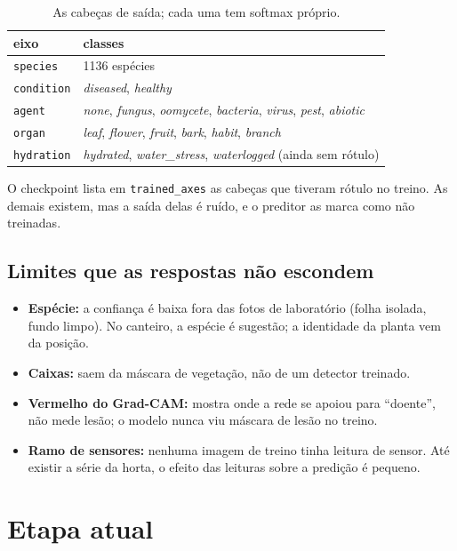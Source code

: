 \documentclass[11pt,a4paper]{article}
\newcommand{\cod}[1]{\texttt{#1}}
\begin{document}
\begin{table}[h]
\centering\small
\begin{tabularx}{0.92\linewidth}{@{}lX@{}}
\toprule
eixo & classes \\
\midrule
\cod{species}   & 1136 espécies \\
\cod{condition} & \emph{diseased}, \emph{healthy} \\
\cod{agent}     & \emph{none}, \emph{fungus}, \emph{oomycete}, \emph{bacteria}, \emph{virus}, \emph{pest}, \emph{abiotic} \\
\cod{organ}     & \emph{leaf}, \emph{flower}, \emph{fruit}, \emph{bark}, \emph{habit}, \emph{branch} \\
\cod{hydration} & \emph{hydrated}, \emph{water\_stress}, \emph{waterlogged} (ainda sem rótulo) \\
\bottomrule
\end{tabularx}
\caption{As cabeças de saída; cada uma tem softmax próprio.}
\end{table}

O checkpoint lista em \cod{trained\_axes} as cabeças que tiveram rótulo no treino.
As demais existem, mas a saída delas é ruído, e o preditor as marca como não
treinadas.

\subsection{Limites que as respostas não escondem}
\begin{itemize}
  \item \textbf{Espécie:} a confiança é baixa fora das fotos de laboratório (folha
  isolada, fundo limpo). No canteiro, a espécie é sugestão; a identidade da planta vem
  da posição.
  \item \textbf{Caixas:} saem da máscara de vegetação, não de um detector treinado.
  \item \textbf{Vermelho do Grad-CAM:} mostra onde a rede se apoiou para ``doente'',
  não mede lesão; o modelo nunca viu máscara de lesão no treino.
  \item \textbf{Ramo de sensores:} nenhuma imagem de treino tinha leitura de sensor.
  Até existir a série da horta, o efeito das leituras sobre a predição é pequeno.
\end{itemize}

\section{Etapa atual}
\end{document}

